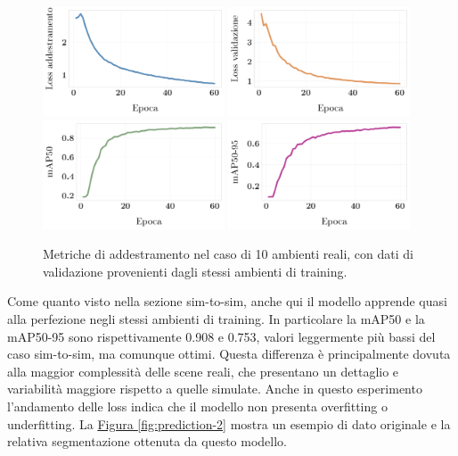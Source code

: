 \documentclass[12pt]{report}
\begin{document}
\begin{figure}[h!]
	\centering
	{\includegraphics[width=0.48\textwidth]{images/domain-shift/real-to-real/1/train-loss}}
	\hspace{0.01\textwidth}
	{\includegraphics[width=0.48\textwidth]{images/domain-shift/real-to-real/1/validation-loss}}
	\hspace{0.01\textwidth}
	\\
	{\includegraphics[width=0.48\textwidth]{images/domain-shift/real-to-real/1/map50}}
	\hspace{0.01\textwidth}
	{\includegraphics[width=0.48\textwidth]{images/domain-shift/real-to-real/1/map50-95}}
	\caption{Metriche di addestramento nel caso di 10 ambienti reali, con dati di validazione provenienti dagli stessi ambienti di training.}
	\label{fig:training-3}
\end{figure}

Come quanto visto nella sezione sim-to-sim, anche qui il modello apprende quasi alla perfezione negli stessi ambienti di training. In particolare la mAP50 e la mAP50-95 sono rispettivamente 0.908 e 0.753, valori leggermente più bassi del caso sim-to-sim, ma comunque ottimi. Questa differenza è principalmente dovuta alla maggior complessità delle scene reali, che presentano un dettaglio e variabilità maggiore rispetto a quelle simulate. Anche in questo esperimento l'andamento delle loss indica che il modello non presenta overfitting o underfitting. La \hyperref[fig:prediction-2]{Figura \ref{fig:prediction-2}} mostra un esempio di dato originale e la relativa segmentazione ottenuta da questo modello.
\end{document}

